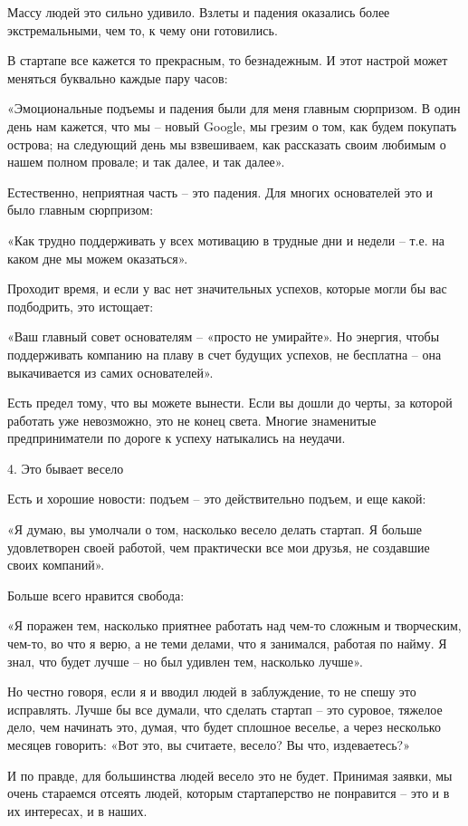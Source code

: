 \documentclass[ebook,12pt,oneside,openany]{memoir}
\begin{document}
Массу людей это сильно удивило. Взлеты и падения оказались более
экстремальными, чем то, к чему они готовились.

В стартапе все кажется то прекрасным, то безнадежным. И этот настрой
может меняться буквально каждые пару часов:

«Эмоциональные подъемы и падения были для меня главным сюрпризом. В
один день нам кажется, что мы – новый Google, мы грезим о том, как
будем покупать острова; на следующий день мы взвешиваем, как
рассказать своим любимым о нашем полном провале; и так далее, и так
далее».

Естественно, неприятная часть – это падения. Для многих основателей
это и было главным сюрпризом:

«Как трудно поддерживать у всех мотивацию в трудные дни и недели –
т.е. на каком дне мы можем оказаться».

Проходит время, и если у вас нет значительных успехов, которые могли
бы вас подбодрить, это истощает:

«Ваш главный совет основателям – «просто не умирайте». Но энергия,
чтобы поддерживать компанию на плаву в счет будущих успехов, не
бесплатна – она выкачивается из самих основателей».

Есть предел тому, что вы можете вынести. Если вы дошли до черты, за
которой работать уже невозможно, это не конец света. Многие знаменитые
предприниматели по дороге к успеху натыкались на неудачи.

4. Это бывает весело

Есть и хорошие новости: подъем – это действительно подъем, и еще
какой:

«Я думаю, вы умолчали о том, насколько весело делать стартап. Я больше
удовлетворен своей работой, чем практически все мои друзья, не
создавшие своих компаний».

Больше всего нравится свобода:

«Я поражен тем, насколько приятнее работать над чем-то сложным и
творческим, чем-то, во что я верю, а не теми делами, что я занимался,
работая по найму. Я знал, что будет лучше – но был удивлен тем,
насколько лучше».

Но честно говоря, если я и вводил людей в заблуждение, то не спешу это
исправлять. Лучше бы все думали, что сделать стартап – это суровое,
тяжелое дело, чем начинать это, думая, что будет сплошное веселье, а
через несколько месяцев говорить: «Вот это, вы считаете, весело? Вы
что, издеваетесь?»

И по правде, для большинства людей весело это не будет. Принимая
заявки, мы очень стараемся отсеять людей, которым стартаперство не
понравится – это и в их интересах, и в наших.
\end{document}

